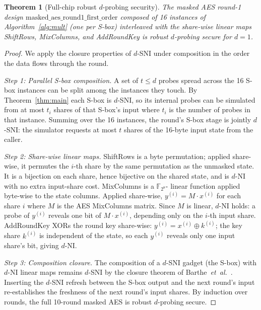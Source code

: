 \documentclass[lettersize,journal]{IEEEtran}
\newtheorem{theorem}{Theorem}
\newcommand{\share}[2]{#1^{(#2)}}
\begin{document}
\begin{theorem}[Full-chip robust $d$-probing security]
\label{thm:fullchip}
The masked AES round-1 design
$\mathrm{masked\_aes\_round1\_first\_order}$ composed of 16 instances of
Algorithm~\ref{alg:mult} (one per S-box) interleaved with the share-wise
linear maps ShiftRows, MixColumns, and AddRoundKey is robust $d$-probing
secure for $d=1$.
\end{theorem}
\begin{proof}
We apply the closure properties of $d$-SNI under composition in the order
the data flows through the round.

\emph{Step 1: Parallel S-box composition.}
A set of $t \le d$ probes spread across the 16 S-box instances can be split
among the instances they touch.  By Theorem~\ref{thm:main} each S-box is
$d$-SNI, so its internal probes can be simulated from at most $t_i$ shares
of that S-box's input where $t_i$ is the number of probes in that instance.
Summing over the 16 instances, the round's S-box stage is jointly
$d$-SNI: the simulator requests at most $t$ shares of the 16-byte input
state from the caller.

\emph{Step 2: Share-wise linear maps.}
ShiftRows is a byte permutation; applied share-wise, it permutes the
$i$-th share by the same permutation as the unmasked state.  It is a
bijection on each share, hence bijective on the shared state, and is
$d$-NI with no extra input-share cost.  MixColumns is a $\mathbb{F}_{2^8}$-
linear function applied byte-wise to the state columns.  Applied
share-wise, $\share{y}{i} = M \cdot \share{x}{i}$ for each share $i$
where $M$ is the AES MixColumns matrix.  Since $M$ is linear, $d$-NI
holds: a probe of $\share{y}{i}$ reveals one bit of $M \cdot
\share{x}{i}$, depending only on the $i$-th input share.  AddRoundKey
XORs the round key share-wise: $\share{y}{i} = \share{x}{i} \oplus
\share{k}{i}$; the key share $\share{k}{i}$ is independent of the
state, so each $\share{y}{i}$ reveals only one input share's bit,
giving $d$-NI.

\emph{Step 3: Composition closure.}
The composition of a $d$-SNI gadget (the S-box) with $d$-NI linear
maps remains $d$-SNI by the closure theorem of
Barthe~\emph{et~al.}~\cite{barthe2016strong}.  Inserting the
$d$-SNI refresh between the S-box output and the next round's
input re-establishes the freshness of the next round's input
shares.  By induction over rounds, the full 10-round masked AES is
robust $d$-probing secure.
\end{proof}
\end{document}
